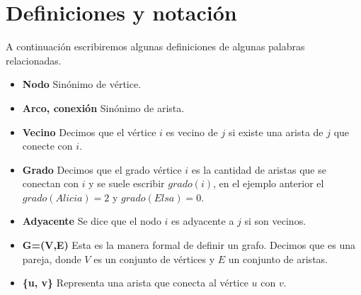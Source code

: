 \section*{Definiciones y notación}
A continuación escribiremos algunas definiciones de algunas palabras relacionadas.
\begin{itemize}
	\item \textbf{Nodo} Sinónimo de vértice.
	
	\item \textbf{Arco, conexión} Sinónimo de arista.
	
	\item \textbf{Vecino} Decimos que el vértice \(i\) es vecino de \(j\) si existe una arista de \(j\) que conecte con \(i\).
	
	\item \textbf{Grado} Decimos que el grado vértice \(i\) es la cantidad de aristas que se conectan con \(i\) y se suele escribir \(grado(i)\), en el ejemplo anterior el \(grado(Alicia)=2\) y \(grado(Elsa)=0\).
	
	\item \textbf{Adyacente} Se dice que el nodo \(i\) es adyacente a \(j\) si son vecinos.

	\item \textbf{G=(V,E)} Esta es la manera formal de definir un grafo.  Decimos que es una pareja, donde \(V\) es un conjunto de vértices y \(E\) un conjunto de aristas.
	
	\item \textbf{\{u, v\}} Representa una arista que conecta al vértice \(u\) con \(v\). 
\end{itemize}
